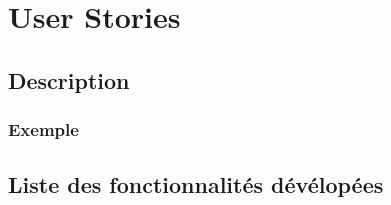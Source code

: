 \section{User Stories}
\subsection{Description }
\subsubsection{Exemple }
\subsection{Liste des fonctionnalités dévélopées}